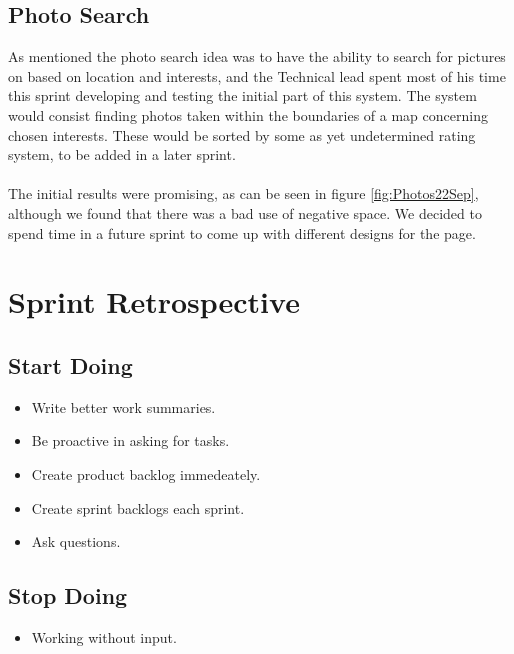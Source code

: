 \subsection*{Photo Search}
As mentioned the photo search idea was to have the ability to search for pictures on based on location and interests, and the Technical lead spent most of his time this sprint developing and testing the initial part of this system. The system would consist finding photos taken within the boundaries of a map concerning chosen interests. These would be sorted by some as yet undetermined rating system, to be added in a later sprint.
\paragraph*{} The initial results were promising, as can be seen in figure \ref{fig:Photos22Sep}, although we found that there was a bad use of negative space. We decided to spend time in a future sprint to come up with different designs for the page.

\section{Sprint Retrospective}
\label{sec:S1Retrospective}

\subsection{Start Doing}
\label{subsec:S1RetrospectiveStart}

\begin{itemize}
  \item Write better work summaries.
  \item Be proactive in asking for tasks.
  \item Create product backlog immedeately.
  \item Create sprint backlogs each sprint.
  \item Ask questions.
\end{itemize}

\subsection{Stop Doing}
\label{subsec:S1RetrospectiveStop}

\begin{itemize}
  \item Working without input.
\end{itemize}

